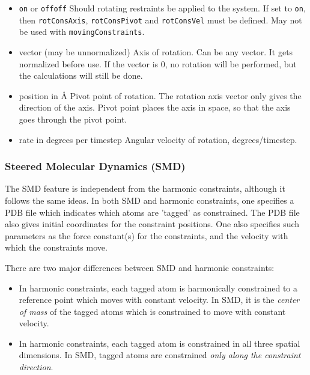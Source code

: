 \begin{itemize}

\item
{}
{{\tt on} or {\tt off}}{{\tt off}}
{Should rotating restraints be applied to the system. If set
to {\tt on}, then {\tt rotConsAxis}, {\tt rotConsPivot} and
{\tt rotConsVel} must be defined.
May not be used with {\tt movingConstraints}.}

\item
{}
{vector (may be unnormalized)}
{Axis of rotation. Can be any vector. It gets
normalized before use. If the vector is 0,
no rotation will be performed, but the calculations
will still be done.}

\item
{}
{position in \AA}
{Pivot point of rotation. The rotation axis vector
only gives the direction of the axis. Pivot point
places the axis in space, so that the axis goes
through the pivot point.}

\item
{}
{rate in degrees per timestep}
{Angular velocity of rotation, degrees/timestep.}

\end{itemize}


\subsubsection{Steered Molecular Dynamics (SMD)}

The SMD feature is independent from the harmonic constraints, although it
follows the same ideas.  In both SMD and harmonic constraints, one specifies
a PDB file which indicates which atoms are 'tagged' as constrained.  The PDB
file also gives initial coordinates for the constraint positions.  One also
specifies such parameters as the force constant(s) for the constraints, 
and the velocity with which the constraints move.  

There are two major differences between SMD and
harmonic constraints:
\begin{itemize}
\item In harmonic constraints, each tagged atom is harmonically constrained
  to a reference point which moves with constant velocity.  In SMD, it is
  the {\em center of mass} of the tagged atoms which is constrained to move
  with constant velocity.

\item In harmonic constraints, each tagged atom is constrained in all three
  spatial dimensions.  In SMD, tagged atoms are constrained {\em only along
  the constraint direction}.
\end{itemize}


